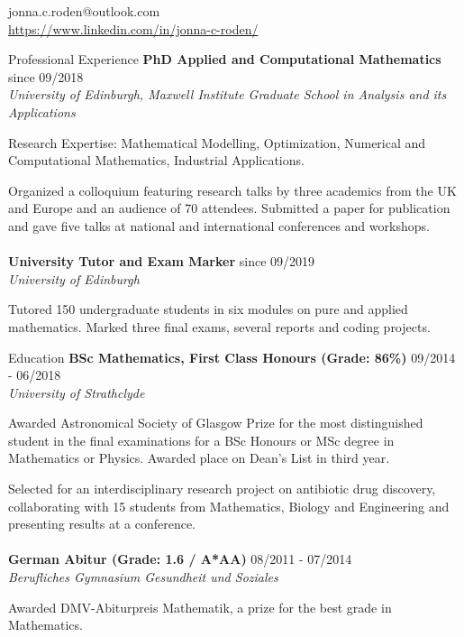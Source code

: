\documentclass{resume} %
\begin{document}
 \hfill{jonna.c.roden@outlook.com} \\
 \hfill{\url{https://www.linkedin.com/in/jonna-c-roden/}}
 
\begin{rSection}{Professional Experience}
{\bf PhD Applied and Computational Mathematics} \hfill{since 09/2018}\\
{\it University of Edinburgh, Maxwell Institute Graduate School in Analysis and its Applications}

Research Expertise: Mathematical Modelling, Optimization, Numerical and Computational Mathematics, Industrial Applications.

Organized a colloquium featuring research talks by three academics from the UK and Europe and an audience of 70 attendees. Submitted a paper for publication and gave five talks at national and international conferences and workshops.
\\
\\
{\bf University Tutor and Exam Marker} \hfill{since 09/2019}\\
{\it University of Edinburgh}

Tutored 150 undergraduate students in six modules on pure and applied mathematics. Marked three final exams, several reports and coding projects.
 
\end{rSection}		
\begin{rSection}{Education}	
{\bf BSc Mathematics, First Class Honours (Grade: 86\%)} \hfill{09/2014 - 06/2018}	\\
{\it University of Strathclyde}

Awarded Astronomical Society of Glasgow Prize for the most distinguished student in the final examinations for a BSc Honours or MSc degree in Mathematics or Physics. Awarded place on Dean's List in third year.

Selected for an interdisciplinary research project on antibiotic drug discovery, collaborating with 15 students from Mathematics, Biology and Engineering and presenting results at a conference.
\\
\\
{\bf German Abitur (Grade: 1.6 / A*AA)} \hfill{08/2011 - 07/2014}\\
{\it Berufliches Gymnasium Gesundheit und Soziales}	

Awarded DMV-Abiturpreis Mathematik, a prize for the best grade in Mathematics.	
\end{rSection}	
\end{document}

